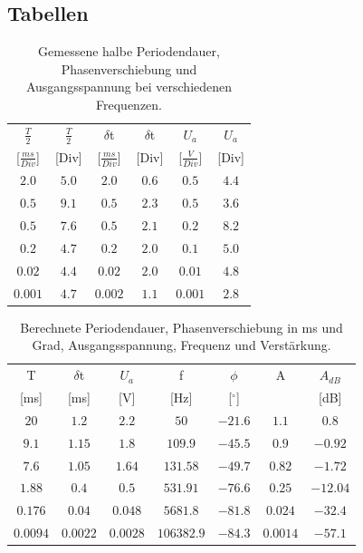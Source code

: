 \documentclass[12pt,a4paper,ngerman]{article}
\begin{document}
\subsection{Tabellen}
\begin{table}[H]
\begin{center}
\begin{tabular}{ |c|c||c|c||c|c| }
  \hline
    $\frac{T}{2}$ & $\frac{T}{2}$ & $\delta$t & $\delta$t & $U_a$ & $U_a$\\

    [$\frac{ms}{Div}$] & [Div] & [$\frac{ms}{Div}$] & [Div] & [$\frac{V}{Div}$] & [Div]\\
  \hline
$2.0$ & $5.0$ & $2.0$ & $0.6$ & $0.5$ & $4.4$ \\
  \hline
$0.5$ & $9.1$ & $0.5$ & $2.3$ & $0.5$ & $3.6$ \\
  \hline
$0.5$ & $7.6$ & $0.5$ & $2.1$ & $0.2$ & $8.2$ \\
  \hline
$0.2$ & $4.7$ & $0.2$ & $2.0$ & $0.1$ & $5.0$ \\
  \hline
$0.02$ & $4.4$ & $0.02$ & $2.0$ & $0.01$ & $4.8$ \\
  \hline
$0.001$ & $4.7$ & $0.002$ & $1.1$ & $0.001$ & $2.8$ \\
  \hline
\end{tabular}
\caption{Gemessene halbe Periodendauer, Phasenverschiebung und Ausgangsspannung bei verschiedenen Frequenzen.}
\end{center}
\label{tab:2}
\end{table}

\begin{table}[H]
\begin{center}
\begin{tabular}{ |c|c|c|c|c|c|c| }
  \hline
    T & $\delta$t & $U_a$ & f & $\phi$ & A & $A_{dB}$\\

    [ms] & [ms] & [V] & [Hz] & [$^\circ$] & & [dB]\\
  \hline
$20$ & $1.2$ & $2.2$ & $50$ & $-21.6$ & $1.1$ & $0.8$\\
  \hline
$9.1$ & $1.15$ & $1.8$ & $109.9$ & $-45.5$ & $0.9$ & $-0.92$\\
  \hline
$7.6$ & $1.05$ & $1.64$ & $131.58$ & $-49.7$ & $0.82$ & $-1.72$\\
  \hline
$1.88$ & $0.4$ & $0.5$ & $531.91$ & $-76.6$ & $0.25$ & $-12.04$\\
  \hline
$0.176$ & $0.04$ & $0.048$ & $5681.8$ & $-81.8$ & $0.024$ & $-32.4$\\
  \hline
$0.0094$ & $0.0022$ & $0.0028$ & $106382.9$ & $-84.3$ & $0.0014$ & $-57.1$\\
  \hline
\end{tabular}
\caption{Berechnete Periodendauer, Phasenverschiebung in ms und Grad, Ausgangsspannung, Frequenz und Verstärkung.}
\end{center}
\label{tab:2_ber}
\end{table}
\end{document}
